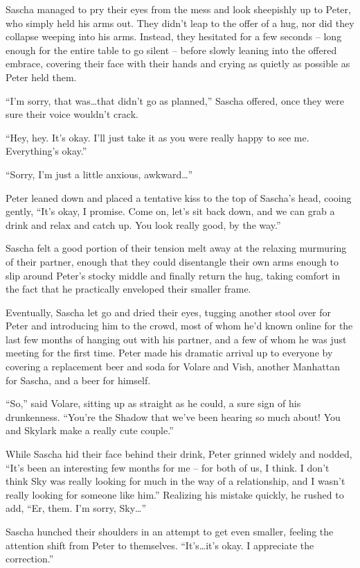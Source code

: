 Sascha managed to pry their eyes from the mess and look sheepishly up to Peter, who simply held his arms out. They didn't leap to the offer of a hug, nor did they collapse weeping into his arms. Instead, they hesitated for a few seconds -- long enough for the entire table to go silent -- before slowly leaning into the offered embrace, covering their face with their hands and crying as quietly as possible as Peter held them.

``I'm sorry, that was\ldots{}that didn't go as planned,'' Sascha offered, once they were sure their voice wouldn't crack.

``Hey, hey. It's okay. I'll just take it as you were really happy to see me. Everything's okay.''

``Sorry, I'm just a little anxious, awkward\ldots{}''

Peter leaned down and placed a tentative kiss to the top of Sascha's head, cooing gently, ``It's okay, I promise. Come on, let's sit back down, and we can grab a drink and relax and catch up. You look really good, by the way.''

Sascha felt a good portion of their tension melt away at the relaxing murmuring of their partner, enough that they could disentangle their own arms enough to slip around Peter's stocky middle and finally return the hug, taking comfort in the fact that he practically enveloped their smaller frame.

Eventually, Sascha let go and dried their eyes, tugging another stool over for Peter and introducing him to the crowd, most of whom he'd known online for the last few months of hanging out with his partner, and a few of whom he was just meeting for the first time. Peter made his dramatic arrival up to everyone by covering a replacement beer and soda for Volare and Vish, another Manhattan for Sascha, and a beer for himself.

``So,'' said Volare, sitting up as straight as he could, a sure sign of his drunkenness. ``You're the Shadow that we've been hearing so much about! You and Skylark make a really cute couple.''

While Sascha hid their face behind their drink, Peter grinned widely and nodded, ``It's been an interesting few months for me -- for both of us, I think. I don't think Sky was really looking for much in the way of a relationship, and I wasn't really looking for someone like him.'' Realizing his mistake quickly, he rushed to add, ``Er, them. I'm sorry, Sky\ldots{}''

Sascha hunched their shoulders in an attempt to get even smaller, feeling the attention shift from Peter to themselves. ``It's\ldots{}it's okay. I appreciate the correction.''

